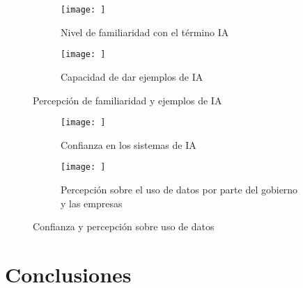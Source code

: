 \documentclass[12pt,a4paper]{article}
\begin{document}

\begin{figure}[h!]
    \centering
    \begin{subfigure}{0.45\linewidth}
        \centering
        \texttt{[image: ]}
        \caption{Nivel de familiaridad con el término IA}
        \label{fig:f3}
    \end{subfigure}
    \hfill
    \begin{subfigure}{0.45\linewidth}
        \centering
        \texttt{[image: ]}
        \caption{Capacidad de dar ejemplos de IA}
        \label{fig:f4}
    \end{subfigure}
    \caption{Percepción de familiaridad y ejemplos de IA}
\end{figure}

\begin{figure}[h!]
    \centering
    \begin{subfigure}{0.45\linewidth}
        \centering
        \texttt{[image: ]}
        \caption{Confianza en los sistemas de IA}
        \label{fig:f5}
    \end{subfigure}
    \hfill
    \begin{subfigure}{0.45\linewidth}
        \centering
        \texttt{[image: ]}
        \caption{Percepción sobre el uso de datos por parte del gobierno y las empresas}
        \label{fig:f6}
    \end{subfigure}
    \caption{Confianza y percepción sobre uso de datos}
\end{figure}

\section*{Conclusiones}
\end{document}
